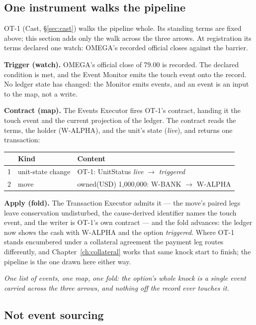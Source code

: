 \documentclass[11pt,a4paper]{article}
\begin{document}
\subsection{One instrument walks the pipeline}

OT-1 (Cast, \S\ref{sec:cast}) walks the pipeline whole. Its standing terms are fixed above;
this section adds only the walk across the three arrows. At registration its terms declared
one watch: OMEGA's recorded official closes against the barrier.

\textbf{Trigger (watch).} OMEGA's official close of 79.00 is recorded. The declared
condition is met, and the Event Monitor emits the touch event
onto the record. No ledger state has changed: the Monitor emits events, and an event is an
input to the map, not a write.

\textbf{Contract (map).} The Events Executor fires OT-1's contract, handing it the touch
event and the current projection of the ledger. The contract reads the terms, the holder
(\mbox{W-ALPHA}), and the unit's state (\emph{live}), and
returns one transaction:

\begin{center}
\begin{tabular}{@{}rll@{}}
\toprule
 & Kind & Content \\
\midrule
1 & unit-state change & OT-1: UnitStatus \emph{live} $\to$ \emph{triggered} \\
2 & move & owned(USD) 1{,}000{,}000: W-BANK $\to$ W-ALPHA \\
\bottomrule
\end{tabular}
\end{center}

\textbf{Apply (fold).} The Transaction Executor admits it --- the move's paired legs leave
conservation undisturbed, the cause-derived identifier names the touch event, and the
writer is OT-1's own contract --- and the fold advances: the ledger now shows the cash with
\mbox{W-ALPHA} and the option \emph{triggered}. Where OT-1 stands encumbered under a
collateral agreement the payment leg routes differently, and Chapter~\ref{ch:collateral}
works that same knock start to finish; the pipeline is the one drawn here either way.

\emph{One list of events, one map, one fold: the option's whole knock is a single event
carried across the three arrows, and nothing off the record ever touches it.}

\subsection{Not event sourcing}
\end{document}
